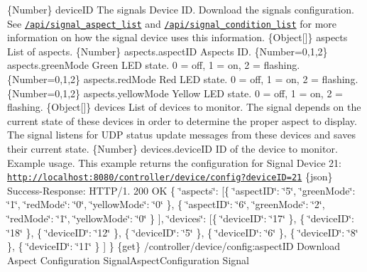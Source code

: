 \{Number\} device\+ID The signal\textquotesingle{}s Device ID.  Download the signal\textquotesingle{}s configuration. See \href{#api-Signal-SignalAspectList}{\tt /api/signal\+\_\+aspect\+\_\+list} and \href{#api-Signal-SignalAspectConditionList}{\tt /api/signal\+\_\+condition\+\_\+list} for more information on how the signal device uses this information.  \{Object\mbox{[}\mbox{]}\} aspects List of aspects.  \{Number\} aspects.\+aspect\+ID Aspect\textquotesingle{}s ID.  \{Number=0,1,2\} aspects.\+green\+Mode Green L\+ED state. 0 = off, 1 = on, 2 = flashing.  \{Number=0,1,2\} aspects.\+red\+Mode Red L\+ED state. 0 = off, 1 = on, 2 = flashing.  \{Number=0,1,2\} aspects.\+yellow\+Mode Yellow L\+ED state. 0 = off, 1 = on, 2 = flashing.  \{Object\mbox{[}\mbox{]}\} devices List of devices to monitor. The signal depends on the current state of these devices in order to determine the proper aspect to display. The signal listens for U\+DP status update messages from these devices and saves their current state.  \{Number\} devices.\+device\+ID ID of the device to monitor.  Example usage. This example returns the configuration for Signal Device 21\+: \href{http://localhost:8080/controller/device/config?deviceID=21}{\tt http\+://localhost\+:8080/controller/device/config?device\+I\+D=21}  \{json\} Success-\/\+Response\+: H\+T\+T\+P/1. 200 OK \{ \char`\"{}aspects\char`\"{}\+: \mbox{[}\{ \char`\"{}aspect\+I\+D\char`\"{}\+: \char`\"{}5\char`\"{}, \char`\"{}green\+Mode\char`\"{}\+: \char`\"{}1\char`\"{}, \char`\"{}red\+Mode\char`\"{}\+: \char`\"{}0\char`\"{}, \char`\"{}yellow\+Mode\char`\"{}\+: \char`\"{}0\char`\"{} \}, \{ \char`\"{}aspect\+I\+D\char`\"{}\+: \char`\"{}6\char`\"{}, \char`\"{}green\+Mode\char`\"{}\+: \char`\"{}2\char`\"{}, \char`\"{}red\+Mode\char`\"{}\+: \char`\"{}1\char`\"{}, \char`\"{}yellow\+Mode\char`\"{}\+: \char`\"{}0\char`\"{} \} \mbox{]}, \char`\"{}devices\char`\"{}\+: \mbox{[}\{ \char`\"{}device\+I\+D\char`\"{}\+: \char`\"{}17\char`\"{} \}, \{ \char`\"{}device\+I\+D\char`\"{}\+: \char`\"{}18\char`\"{} \}, \{ \char`\"{}device\+I\+D\char`\"{}\+: \char`\"{}12\char`\"{} \}, \{ \char`\"{}device\+I\+D\char`\"{}\+: \char`\"{}5\char`\"{} \}, \{ \char`\"{}device\+I\+D\char`\"{}\+: \char`\"{}6\char`\"{} \}, \{ \char`\"{}device\+I\+D\char`\"{}\+: \char`\"{}8\char`\"{} \}, \{ \char`\"{}device\+I\+D\char`\"{}\+: \char`\"{}11\char`\"{} \} \mbox{]} \}  \{get\} /controller/device/config\+:aspect\+ID Download Aspect Configuration  Signal\+Aspect\+Configuration  Signal

